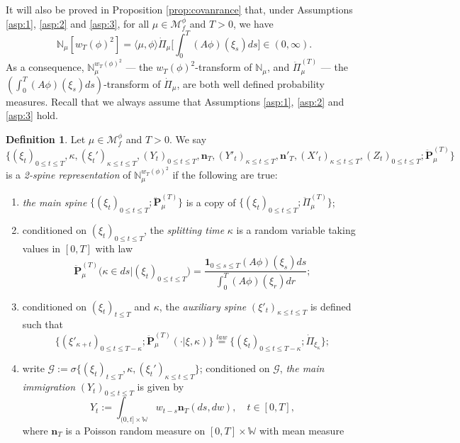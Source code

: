 \documentclass[UTF8]{pkuthss}
\theoremstyle{plain}
\theoremstyle{definition}
\newtheorem{defi}[thm]{Definition}
\numberwithin{equation}{section}
\begin{document}
It will also be proved in Proposition \ref{prop:covanrance} that, under Assumptions \ref{asp:1}, \ref{asp:2} and \ref{asp:3}, for all $\mu \in \mathcal M_f^\phi$ and $T>0$, we have
\[
	\mathbb N_\mu[w_T(\phi)^2]
	= \langle\mu, \phi\rangle \dot{\Pi}_{\mu} \Big[ \int_0^T (A\phi)(\xi_s) ds\Big]\in (0,\infty).
\]
	As a consequence, $\mathbb N_\mu^{w_T(\phi)^2}$ --- the $w_T(\phi)^2$-transform of $\mathbb N_\mu$, and $\ddot{\Pi}^{(T)}_\mu$ --- the $(\int_0^T (A\phi)(\xi_s) ds)$-transform of $\dot{\Pi}_{\mu}$,  are both well defined probability measures.
Recall that we always assume that Assumptions \ref{asp:1}, \ref{asp:2} and \ref{asp:3} hold.
\begin{defi}
	Let $\mu \in \mathcal M_f^\phi$ and $T>0$.
	We say
\[
	\{(\xi_t)_{0\leq t\leq T}, \kappa, (\xi_t')_{\kappa\leq t\leq T}, (Y_t)_{0\leq t\leq T}, \mathbf n_T,(Y'_t)_{\kappa \leq t\leq T}, \mathbf n'_T, (
	X'_t)_{\kappa \leq t\leq T}, (Z_t)_{0\leq t\leq T} ; \ddot {\mathbf P}_\mu^{(T)}\}
\]
	is a \emph{2-spine representation} of $\mathbb N_\mu^{w_T(\phi)^2}$ if the following are true:
\begin{enumerate}
\item
	\emph{the main spine} $\{(\xi_t)_{0\leq t\leq T}; \ddot{\mathbf P}_\mu^{(T)}\}$ is a copy of $\{(\xi_t)_{0\leq t\leq T}; \ddot{\Pi}_{\mu}^{(T)}\}$;
\item
	conditioned on $(\xi_t)_{0\leq t \leq T}$, the \emph{splitting time} $\kappa$ is a random variable taking values in $[0,T]$ with law
\[
	\ddot{\mathbf P}_\mu^{(T)}\big(\kappa \in ds\big|(\xi_t)_{0\leq t\leq T}\big)
	=\frac {\mathbf 1_{0\leq s\leq T} (A\phi)(\xi_s) ds} {\int_0^T (A\phi)(\xi_r) dr};
\]
\item
	conditioned on $(\xi_t)_{t \leq T}$ and $\kappa$, the \emph{auxiliary spine} $(\xi'_t)_{\kappa \leq t \leq T}$ is defined such that
\begin{equation}\label{eq:defAuxilSpin}
	\{(\xi'_{\kappa+t})_{0 \leq t \leq T - \kappa}; \ddot{\mathbf P}_\mu^{(T)}(\cdot | \xi,\kappa) \}
	\overset{law}{=} \{(\xi_t)_{0 \leq t \leq T - \kappa}; \dot{\Pi}_{\xi_\kappa} \};
\end{equation}
\item
	write $\mathscr G
	:= \sigma \{ (\xi_t)_{t \leq T}, \kappa, (\xi_t')_{\kappa \leq t \leq T} \}$;
	conditioned on $\mathscr G$, \emph{the main immigration} $(Y_t)_{0 \leq t\leq T}$ is given by
\[
	Y_t
	:= \int_{(0,t] \times \mathbb W} w_{t-s} \mathbf n_T(ds, dw),
	\quad t\in [0,T],
\]
	where $\mathbf n_T$ is a
	Poisson random measure on $[0,T] \times \mathbb W$ with mean measure

\end{enumerate}
\end{defi}
\end{document}
